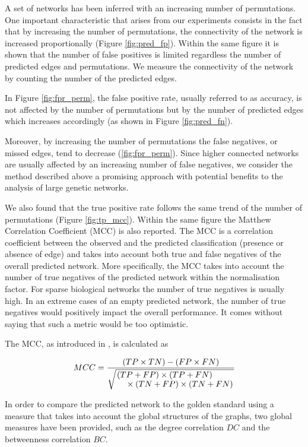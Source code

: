 A set of networks has been inferred with an increasing number of permutations. One important characteristic that arises from our experiments consists in the fact that by increasing the number of permutations, the connectivity of the network is increased proportionally (Figure \ref{fig:pred_fp}). Within the same figure it is shown that the number of false positives is limited regardless the number of predicted edges and permutations.   
We measure the connectivity of the network by counting the number of the predicted edges. 

In Figure \ref{fig:fpr_perm}, the false positive rate, usually referred to as accuracy, is not affected by the number of permutations but by the number of predicted edges which increases accordingly (as shown in Figure \ref{fig:pred_fn}). 

Moreover, by increasing the number of permutations the false negatives, or missed edges, tend to decrease (\ref{fig:fpr_perm}). Since higher connected networks are usually affected by an increasing number of false negatives, we consider the method described above a promising approach with potential benefits to the analysis of large genetic networks. 

We also found that the true positive rate follows the same trend of the number of permutations (Figure \ref{fig:tp_mcc}). Within the same figure the Matthew Correlation Coefficient (MCC) is also reported. The MCC is a correlation coefficient between the observed and the predicted classification (presence or absence of edge) and takes into account both true and false negatives of the overall predicted network. More specifically, the MCC takes into account the number of true negatives of the predicted network within the normalisation factor. For sparse biological networks the number of true negatives is usually high. In an extreme cases of an empty predicted network, the number of true negatives would positively impact the overall performance. It comes without saying that such a metric would be too optimistic. 

The MCC, as introduced in \citealp{Matthews1975}, is calculated as 

\begin{equation}
MCC = \frac{(TP \times TN) - (FP \times FN)}{\sqrt{\splitfrac{(TP+FP)\times(TP+FN)}{
\times(TN+FP)\times(TN+FN)} }}
\label{eq:mcc}
\end{equation}

In order to compare the predicted network to the golden standard using a measure that takes into account the global structures of the graphs, two global measures have been provided, such as the degree correlation $DC$ and the betweenness correlation $BC$.
 
